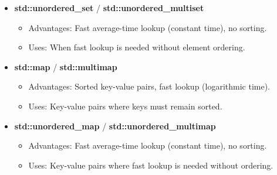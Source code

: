 \documentclass{report}
\begin{document}
\begin{itemize}
    \item \textbf{std::unordered\_set} / \textbf{std::unordered\_multiset}
    \begin{itemize}
        \item Advantages: Fast average-time lookup (constant time), no sorting.
        \item Uses: When fast lookup is needed without element ordering.
    \end{itemize}
    
    \item \textbf{std::map} / \textbf{std::multimap}
    \begin{itemize}
        \item Advantages: Sorted key-value pairs, fast lookup (logarithmic time).
        \item Uses: Key-value pairs where keys must remain sorted.
    \end{itemize}
    
    \item \textbf{std::unordered\_map} / \textbf{std::unordered\_multimap}
    \begin{itemize}
        \item Advantages: Fast average-time lookup (constant time), no sorting.
        \item Uses: Key-value pairs where fast lookup is needed without ordering.
    \end{itemize}
\end{itemize}






   \pagebreak 
\end{document}
